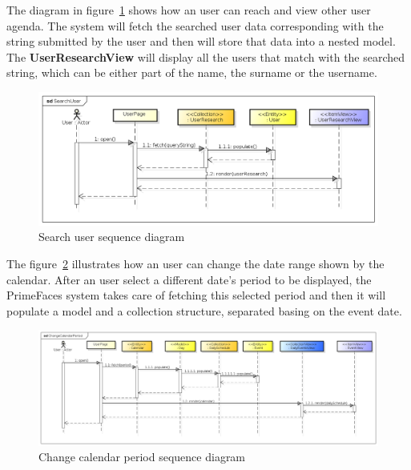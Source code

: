The diagram in figure~\ref{fig:searchuseq} shows how an user can reach and view other user agenda. The system will fetch the searched user data corresponding with the string submitted by the user and then will store that data into a nested model. The {\bf UserResearchView} will display all the users that match with the searched string, which can be either part of the name, the surname or the username. 
    \begin{center}
 \begin{figure}[H]
    \includegraphics[width=1\textwidth]{./BCEDiagram/BCE/EntityOverview/SearchUser.png}
    \caption{Search user sequence diagram}
     \label{fig:searchuseq}
     \end{figure}
   \end{center} 
The figure~\ref{fig:usercalese} illustrates how an user can change the date range shown by the calendar. After an user select a different date's period to be displayed, the PrimeFaces system takes care of fetching this selected period and then it will populate a model and a collection  structure, separated basing on the event date.
 \begin{center}
 \begin{figure}[H]
    \includegraphics[width=1\textwidth]{./BCEDiagram/BCE/EntityOverview/ChangeCalendarPeriod.png}
    \caption{Change calendar period sequence diagram}
     \label{fig:usercalese}
     \end{figure}
   \end{center} 
